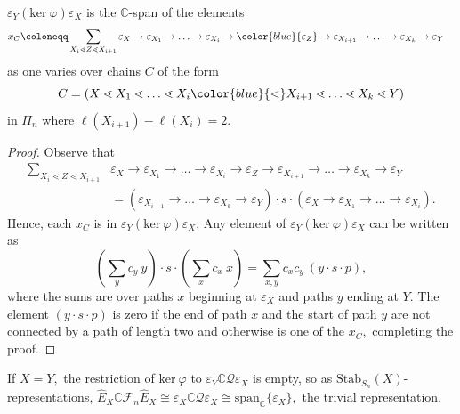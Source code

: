 \documentclass[ALCO, Unicode]{cedram}
\def \ker{\mathrm{ker}}
\def\C{{\mathbb{C}}}
\def\stab{\mathrm{Stab}}
\begin{document}
\begin{lemma}\label{lem:kernel}
   $\varepsilon_Y \left( \ker \ \varphi  \right)\varepsilon_X$ is the $\C$-span of the elements 
\begin{align*}
    x_C & \coloneqq  \sum_{X_i \lessdot Z \lessdot X_{i + 1}}\varepsilon_{X} \to \varepsilon_{X_1} \to \ldots \to \varepsilon_{X_i} \to \color{blue}{\varepsilon_Z}\normalcolor \to \varepsilon_{X_{i + 1}} \to \ldots \to \varepsilon_{X_k} \to \varepsilon_{Y}
    \end{align*}
    as one varies over chains $C$ of the form \[C = \left(X \lessdot X_1 \lessdot \ldots \lessdot X_i \color{blue}{<}\normalcolor  X_{i + 1} \lessdot \ldots \lessdot X_k \lessdot Y\right)\] in $\Pi_n$ where $\ell(X_{i + 1}) - \ell(X_i) = 2.$
\end{lemma}
\begin{proof}
    Observe that \begin{align*}
   \sum_{X_i \lessdot Z \lessdot X_{i + 1}}&\varepsilon_{X} \to \varepsilon_{X_1} \to \ldots \to \varepsilon_{X_i} \to \varepsilon_Z \to \varepsilon_{X_{i + 1}} \to \ldots \to \varepsilon_{X_k} \to \varepsilon_{Y}\\
    &= \left(\varepsilon_{X_{i + 1}} \to \ldots \to \varepsilon_{X_k} \to \varepsilon_{Y}\right)\cdot s\cdot \left(\varepsilon_{X} \to \varepsilon_{X_1} \to \ldots \to \varepsilon_{X_i}\right).
\end{align*}
 Hence, each $x_C$ is  in   $\varepsilon_Y \left( \ker \ \varphi  \right)\varepsilon_X$. Any element of   $\varepsilon_Y \left( \ker \ \varphi  \right)\varepsilon_X$ can be written as \[\left(\sum_{y} c_{y}\ y\right) \cdot s \cdot \left(\sum_{x} c_x \ x\right)  = \sum_{x, y} c_xc_y \  (y\cdot s \cdot p),\] where the sums are over paths $x$ beginning at $\varepsilon_X$ and paths $y$ ending at $Y.$ The element $(y\cdot s \cdot p)$ is zero if the end of path $x$ and the start of path $y$ are not connected by a path of length two and otherwise is one of the $x_C,$ completing the proof.
\end{proof}
 
 If $X = Y,$ the restriction of $\ker \  \varphi$ to $\varepsilon_Y \C \mathcal{Q} \varepsilon_X$ is empty, so as $\stab_{S_n}(X)$-representations, $\widehat{E}_X \C \mathcal{F}_n \widehat{E}_X \cong \varepsilon_X \C \mathcal{Q} \varepsilon_X \cong \mathrm{span}_{\C}\{\varepsilon_X\},$ the trivial representation.
 
\end{document}
